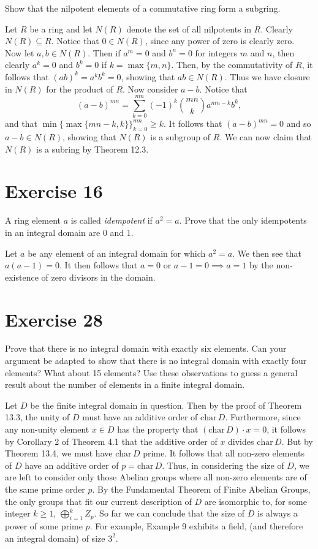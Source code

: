 \documentclass[12pt]{article}
\newcommand{\chr}{\mbox{char}\,}
\begin{document}
Show that the nilpotent elements of a commutative ring form a subgring.

Let $R$ be a ring and let $N(R)$ denote the set of all nilpotents in $R$.
Clearly $N(R)\subseteq R$.  Notice that $0\in N(R)$, since any power
of zero is clearly zero.  Now let $a,b\in N(R)$.  Then if $a^m=0$
and $b^n=0$ for integers $m$ and $n$, then clearly $a^k=0$ and $b^k=0$
if $k=\max\{m,n\}$.
Then, by the commutativity of $R$, it follows that $(ab)^k=a^kb^k=0$,
showing that $ab\in N(R)$.
Thus we have closure in $N(R)$ for the product of $R$.
Now consider $a-b$.  Notice that
\begin{equation*}
(a-b)^{mn} = \sum_{k=0}^{mn}(-1)^k\binom{mn}{k}a^{mn-k}b^k,
\end{equation*}
and that $\min\{\max\{mn-k,k\}\}_{k=0}^{mn}\geq k$.
It follows that $(a-b)^{mn}=0$ and so $a-b\in N(R)$,
showing that $N(R)$ is a subgroup of $R$.  We can now claim that
$N(R)$ is a subring by Theorem 12.3.

\section*{Exercise 16}

A ring element $a$ is called {\it idempotent} if $a^2=a$.  Prove that
the only idempotents in an integral domain are 0 and 1.

Let $a$ be any element of an integral domain for which $a^2=a$.
We then see that $a(a-1)=0$.  It then follows that $a=0$ or $a-1=0\implies a=1$
by the non-existence of zero divisors in the domain.

\section*{Exercise 28}

Prove that there is no integral domain with exactly six elements.
Can your argument be adapted to show that there is no integral
domain with exactly four elements?  What about 15 elements?
Use these observations to guess a general result about the number
of elements in a finite integral domain.

Let $D$ be the finite integral domain in question.  Then by the proof
of Theorem 13.3, the unity of $D$ must have an additive
order of $\chr D$.  Furthermore, since any non-unity element $x\in D$
has the property that $(\chr D)\cdot x=0$, it follows by Corollary 2 of Theorem 4.1
that the additive order of $x$ divides $\chr D$.  But by Theorem 13.4,
we must have $\chr D$ prime.  It follows that all non-zero elements
of $D$ have an additive order of $p=\chr D$.  Thus, in considering the
size of $D$, we are left to consider only those Abelian groups where
all non-zero elements are of the same prime order $p$.
By the Fundamental Theorem of Finite Abelian Groups, the
only groups that fit our current description of $D$ are
isomorphic to, for some integer $k\geq 1$, $\bigoplus_{i=1}^k Z_p$.
So far we can conclude that the size of $D$ is always a power
of some prime $p$.  For example, Example 9 exhibits
a field, (and therefore an integral domain) of size $3^2$.
\end{document}
